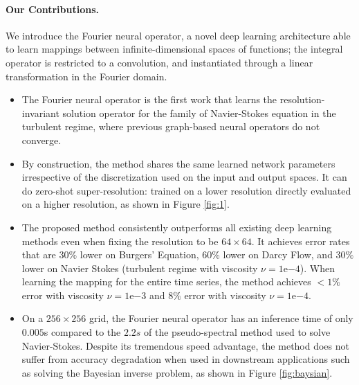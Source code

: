 \documentclass{article} %
\begin{document}
\paragraph{Our Contributions.}
\label{ssec:OC}
We introduce the Fourier neural operator, a novel deep learning architecture able to learn mappings between infinite-dimensional spaces of functions; the integral operator is restricted to a convolution, and instantiated through a linear transformation in the Fourier domain.
\begin{itemize}[leftmargin=*]
\item The Fourier neural operator is the first work that learns the resolution-invariant solution operator for the family of Navier-Stokes equation in the turbulent regime, where previous graph-based neural operators do not converge.
\item By construction, the method shares the same learned network parameters irrespective of the discretization used on the input and output spaces. It can do zero-shot super-resolution: trained on a lower resolution directly evaluated on a higher resolution, as shown in Figure \ref{fig:1}.
\item The proposed method consistently outperforms all existing deep learning methods even when fixing the resolution to be $64 \times 64$. It achieves error rates that are $30\%$ lower on Burgers' Equation, $60\%$ lower on Darcy Flow, and $30\%$ lower on Navier Stokes (turbulent regime with viscosity $\nu=1\mathrm{e}{-4}$).
When learning the mapping for the entire time series, the method achieves $<1\%$ error with viscosity $\nu=1\mathrm{e}{-3}$ and $8\%$ error with viscosity $\nu=1\mathrm{e}{-4}$.
\item On a $256 \times 256$ grid, the Fourier neural operator has an inference time of only $0.005$s compared to the $2.2s$ of the pseudo-spectral method used to solve Navier-Stokes.
Despite its tremendous speed advantage, the method does not suffer from accuracy degradation when used in downstream applications such as solving the Bayesian inverse problem, as shown in Figure \ref{fig:baysian}.
\end{itemize}
\end{document}
